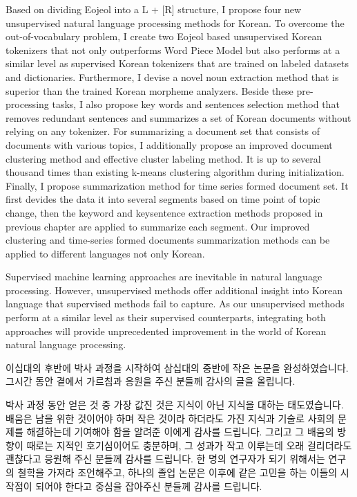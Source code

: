 \documentclass[oneside, ko,phd]{snuthesis_utf8_kor}
\begin{document}
\begin{abstractalt}
Based on dividing Eojeol into a L + [R] structure, I propose four new unsupervised natural language processing methods for Korean. 
To overcome the out-of-vocabulary problem, I create two Eojeol based unsupervised Korean tokenizers that not only outperforms Word Piece Model but also performs at a similar level as supervised Korean tokenizers that are trained on labeled datasets and dictionaries.
Furthermore, I devise a novel noun extraction method that is superior than the trained Korean morpheme analyzers.
Beside these pre-processing tasks, I also propose key words and sentences selection method that removes redundant sentences and summarizes a set of Korean documents without relying on any tokenizer.
For summarizing a document set that consists of documents with various topics, I additionally propose an improved document clustering method and effective cluster labeling method. It is up to several thousand times than existing k-means clustering algorithm during initialization. 
Finally, I propose summarization method for time series formed document set.
It first devides the data it into several segments based on time point of topic change, then the keyword and keysentence extraction methods proposed in previous chapter are applied to summarize each segment.
Our improved clustering and time-series formed documents summarization methods can be applied to different languages not only Korean.

Supervised machine learning approaches are inevitable in natural language processing.
However, unsupervised methods offer additional insight into Korean language that supervised methods fail to capture.
As our unsupervised methods perform at a similar level as their supervised counterparts, integrating both approaches will provide unprecedented improvement in the world of Korean natural language processing.
\end{abstractalt}

\acknowledgement{}

이십대의 후반에 박사 과정을 시작하여 삼십대의 중반에 작은 논문을 완성하였습니다.
그시간 동안 곁에서 가르침과 응원을 주신 분들께 감사의 글을 올립니다.

박사 과정 동안 얻은 것 중 가장 값진 것은 지식이 아닌 지식을 대하는 태도였습니다.
배움은 남을 위한 것이어야 하며 작은 것이라 하더라도 가진 지식과 기술로 사회의 문제를 해결하는데 기여해야 함을 알려준 이에게 감사를 드립니다.
그리고 그 배움의 방향이 때로는 지적인 호기심이어도 충분하며, 그 성과가 작고 이루는데 오래 걸리더라도 괜찮다고 응원해 주신 분들께 감사를 드립니다.
한 명의 연구자가 되기 위해서는 연구의 철학을 가져라 조언해주고, 하나의 졸업 논문은 이후에 같은 고민을 하는 이들의 시작점이 되어야 한다고 중심을 잡아주신 분들께 감사를 드립니다.
\end{document}

